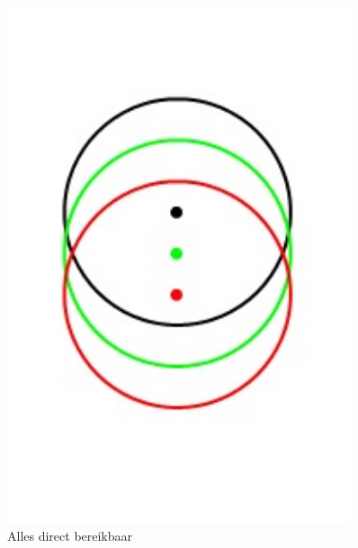 \documentclass[a4paper,10pt]{article}
\begin{document}
\begin{figure}[ht!]
    \begin{minipage}{\textwidth}
        \begin{minipage}{0.3\textwidth}
            \centering
            \includegraphics[width=0.9\textwidth]{een.jpg}
            \caption*{Alles direct bereikbaar}
        \end{minipage}
        \hfill
        \begin{minipage}{0.3\textwidth}
            \centering

\end{minipage}
\end{minipage}
\end{figure}
\end{document}
